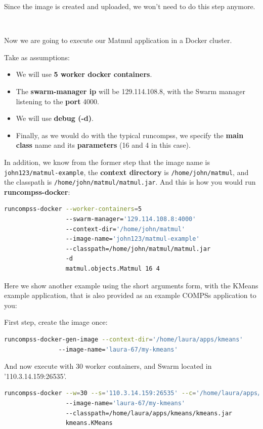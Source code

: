 Since the image is created and uploaded, we won't need to do this step anymore.

~ \newline

Now we are going to execute our Matmul application in a Docker cluster.

Take as assumptions:
\begin{itemize}  
\item We will use \textbf{5 worker docker containers}.
\item The \textbf{swarm-manager ip} will be 129.114.108.8, with the Swarm manager listening to the \textbf{port} 4000.
\item We will use \textbf{debug (-d)}.
\item Finally, as we would do with the typical runcompss, we specify the \textbf{main class} name and its \textbf{parameters} (16 and 4 in this case).
\end{itemize}

In addition, we know from the former step that the image name is \texttt{john123/matmul-example}, 
the \textbf{context directory} is \texttt{/home/john/matmul}, and the classpath is \texttt{/home/john/matmul/matmul.jar}.
And this is how you would run \textbf{runcompss-docker}:

\begin{lstlisting}[language=bash]
runcompss-docker --worker-containers=5
                 --swarm-manager='129.114.108.8:4000'
                 --context-dir='/home/john/matmul'
                 --image-name='john123/matmul-example'
                 --classpath=/home/john/matmul/matmul.jar
                 -d
                 matmul.objects.Matmul 16 4
\end{lstlisting}

Here we show another example using the short arguments form, with the KMeans example application, 
that is also provided as an example COMPSs application to you:

First step, create the image once:
\begin{lstlisting}[language=bash]
runcompss-docker-gen-image --context-dir='/home/laura/apps/kmeans'
			   --image-name='laura-67/my-kmeans'
\end{lstlisting}

And now execute with 30 worker containers, and Swarm located in '110.3.14.159:26535'.
\begin{lstlisting}[language=bash]
runcompss-docker --w=30 --s='110.3.14.159:26535' --c='/home/laura/apps/kmeans' 
                 --image-name='laura-67/my-kmeans'
                 --classpath=/home/laura/apps/kmeans/kmeans.jar
                 kmeans.KMeans
\end{lstlisting}           

